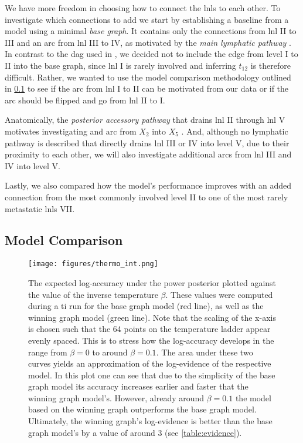 \documentclass[twocolumn]{aastex631}
\begin{document}
We have more freedom in choosing how to connect the \glspl{lnl} to each other. To investigate which connections to add we start by establishing a baseline from a model using a minimal \emph{base graph}. It contains only the connections from \gls{lnl} II to III and an arc from \gls{lnl} III to IV, as motivated by the \emph{main lymphatic pathway} \cite{lengele_anatomical_2007}. In contrast to the \gls{dag} used in \cite{pouymayou_bayesian_2019,ludwig_hidden_2021}, we decided not to include the edge from level I to II into the base graph, since \gls{lnl} I is rarely involved and inferring $t_{12}$ is therefore difficult. Rather, we wanted to use the model comparison methodology outlined in \cref{subsec:complete_model:comparison} to see if the arc from \gls{lnl} I to II can be motivated from our data or if the arc should be flipped and go from \gls{lnl} II to I.

Anatomically, the \emph{posterior accessory pathway} that drains \gls{lnl} II through \gls{lnl} V motivates investigating and arc from $X_2$ into $X_5$ \cite{lengele_anatomical_2007}. And, although no lymphatic pathway is described that directly drains \gls{lnl} III or IV into level V, due to their proximity to each other, we will also investigate additional arcs from \gls{lnl} III and IV into level V.

Lastly, we also compared how the model's performance improves with an added connection from the most commonly involved level II to one of the most rarely metastatic \glspl{lnl} VII.


\subsection{Model Comparison}
\label{subsec:complete_model:comparison}

\begin{figure}
    \centering
    \texttt{[image: figures/thermo\_int.png]}
    \caption{The expected log-accuracy under the power posterior plotted against the value of the inverse temperature $\beta$. These values were computed during a \gls{ti} run for the base graph model (red line), as well as the winning graph model (green line). Note that the scaling of the x-axis is chosen such that the 64 points on the temperature ladder appear evenly spaced. This is to stress how the log-accuracy develops in the range from $\beta=0$ to around $\beta=0.1$. The area under these two curves yields an approximation of the log-evidence of the respective model. In this plot one can see that due to the simplicity of the base graph model its accuracy increases earlier and faster that the winning graph model's. However, already around $\beta=0.1$ the model based on the winning graph outperforms the base graph model. Ultimately, the winning graph's log-evidence is better than the base graph model's by a value of around 3 (see \cref{table:evidence}).}
    \label{fig:thermo_int}
\end{figure}
\end{document}
